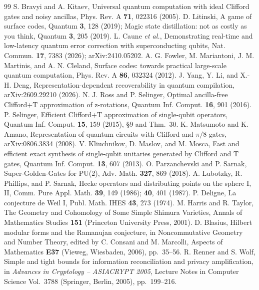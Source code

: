 \documentclass[aps,prx,twocolumn,superscriptaddress,nofootinbib,longbibliography]{revtex4-2}
\theoremstyle{plain}
\theoremstyle{definition}
\theoremstyle{remark}
\begin{document}
\begin{thebibliography}{99}
 S. Bravyi and A. Kitaev, Universal quantum computation with ideal Clifford gates and noisy ancillas, Phys. Rev. A \textbf{71}, 022316 (2005).
 D. Litinski, A game of surface codes, Quantum \textbf{3}, 128 (2019); Magic state distillation: not as costly as you think, Quantum \textbf{3}, 205 (2019).
 L. Caune \emph{et al.}, Demonstrating real-time and low-latency quantum error correction with superconducting qubits, Nat. Commun. \textbf{17}, 7383 (2026); arXiv:2410.05202.
 A. G. Fowler, M. Mariantoni, J. M. Martinis, and A. N. Cleland, Surface codes: towards practical large-scale quantum computation, Phys. Rev. A \textbf{86}, 032324 (2012).
 J. Yang, Y. Li, and X.-H. Deng, Representation-dependent recoverability in quantum compilation, arXiv:2609.29210 (2026).
 N. J. Ross and P. Selinger, Optimal ancilla-free Clifford+T approximation of z-rotations, Quantum Inf. Comput. \textbf{16}, 901 (2016).
 P. Selinger, Efficient Clifford+T approximation of single-qubit operators, Quantum Inf. Comput. \textbf{15}, 159 (2015), \S9 and Thm.~30.
 K. Matsumoto and K. Amano, Representation of quantum circuits with Clifford and $\pi/8$ gates, arXiv:0806.3834 (2008).
 V. Kliuchnikov, D. Maslov, and M. Mosca, Fast and efficient exact synthesis of single-qubit unitaries generated by Clifford and T gates, Quantum Inf. Comput. \textbf{13}, 607 (2013).
 O. Parzanchevski and P. Sarnak, Super-Golden-Gates for PU(2), Adv. Math. \textbf{327}, 869 (2018).
 A. Lubotzky, R. Phillips, and P. Sarnak, Hecke operators and distributing points on the sphere I, II, Comm. Pure Appl. Math. \textbf{39}, 149 (1986); \textbf{40}, 401 (1987).
 P. Deligne, La conjecture de Weil I, Publ. Math. IHES \textbf{43}, 273 (1974).
 M. Harris and R. Taylor, The Geometry and Cohomology of Some Simple Shimura Varieties, Annals of Mathematics Studies \textbf{151} (Princeton University Press, 2001).
 D. Blasius, Hilbert modular forms and the Ramanujan conjecture, in Noncommutative Geometry and Number Theory, edited by C. Consani and M. Marcolli, Aspects of Mathematics \textbf{E37} (Vieweg, Wiesbaden, 2006), pp.~35--56.
 R. Renner and S. Wolf, Simple and tight bounds for information reconciliation and privacy amplification, in \emph{Advances in Cryptology -- ASIACRYPT 2005}, Lecture Notes in Computer Science Vol.~3788 (Springer, Berlin, 2005), pp.~199--216.

\end{thebibliography}
\end{document}
